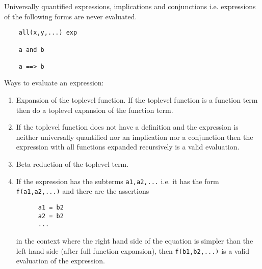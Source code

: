 Universally quantified expressions, implications and conjunctions
i.e. expressions of the following forms are never evaluated.
\begin{lstlisting}
    all(x,y,...) exp

    a and b

    a ==> b
\end{lstlisting}

Ways to evaluate an expression:
\begin{enumerate}
\item Expansion of the toplevel function. If the toplevel function is a
  function term then do a toplevel expansion of the function term.

\item If the toplevel function does not have a definition and the expression
  is neither universally quantified nor an implication nor a conjunction then
  the expression with all functions expanded recursively is a valid evaluation.

\item Beta reduction of the toplevel term.

\item If the expression has the subterms \lstinline!a1,a2,...! i.e. it has the
  form \lstinline!f(a1,a2,...)! and there are the assertions
  \begin{lstlisting}
      a1 = b2
      a2 = b2
      ...
  \end{lstlisting}
  in the context where the right hand side of the equation is simpler than the
  left hand side (after full function expansion), then
  \lstinline!f(b1,b2,...)! is a valid evaluation of the expression.
\end{enumerate}

